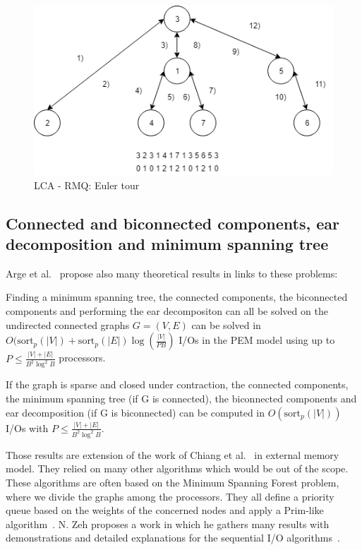 \begin{figure}[!htb]
    \centering
    \includegraphics[width=0.8\linewidth]{Chapters/GPU/Algorithms/EulerTour.png} 
    \caption{LCA - RMQ: Euler tour}
\end{figure}


\subsection{Connected and biconnected components, ear decomposition and minimum spanning tree}

Arge et al.~\cite{arge2010parallel} propose also many theoretical results in links to these problems:

Finding a minimum spanning tree, the connected components, the biconnected components and performing the ear decompositon can all be solved on the undirected connected graphs $G = (V, E)$ can be solved in $O(\text{sort}_{p}(|V|) + \text{sort}_{p}(|E|) \log(\frac{|V|}{PB})$ I/Os in the PEM model using up to $P \leq \frac{|V |+|E|}{B^{2} \log^{2} B}$ processors.

If the graph is sparse and closed under contraction, the connected components, the minimum spanning tree (if G is connected), the biconnected components and ear decomposition (if G is biconnected) can be computed in $O(\text{sort}_{p}(|V|))$ I/Os with $P \leq \frac{|V |+|E|}{B^{2} \log^{2} B}$.

Those results are extension of the work of Chiang et al.~\cite{chiang1995external} in external memory model. They relied on many other algorithms which would be out of the scope. These algorithms are often based on the Minimum Spanning Forest problem, where we divide the graphs among the processors. They all define a priority queue based on the weights of the concerned nodes and apply a Prim-like algorithm~\cite{arge2000external}. N. Zeh proposes a work in which he gathers many results with demonstrations and detailed explanations for the sequential I/O algorithms~\cite{zeh2002efficient}.